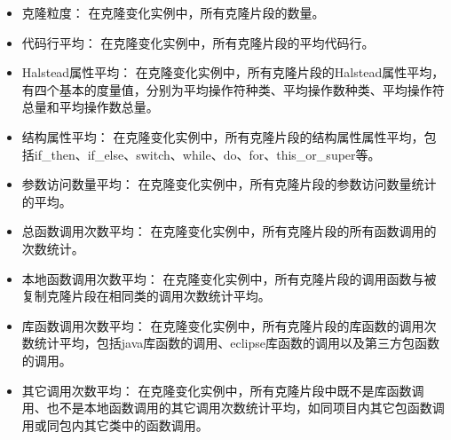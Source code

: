 \begin{itemize}
\item 
克隆粒度：
在克隆变化实例中，所有克隆片段的数量。
\item 
代码行平均：
在克隆变化实例中，所有克隆片段的平均代码行。
\item 
Halstead属性平均：
在克隆变化实例中，所有克隆片段的Halstead属性平均，有四个基本的度量值，分别为平均操作符种类、平均操作数种类、平均操作符总量和平均操作数总量。
\item
结构属性平均：
在克隆变化实例中，所有克隆片段的结构属性属性平均，包括{if\_then、if\_else、switch、while、do、for、this\_or\_super}等。 
\item 
参数访问数量平均：
在克隆变化实例中，所有克隆片段的参数访问数量统计的平均。
\item  
总函数调用次数平均：
在克隆变化实例中，所有克隆片段的所有函数调用的次数统计。
\item  
本地函数调用次数平均：
在克隆变化实例中，所有克隆片段的调用函数与被复制克隆片段在相同类的调用次数统计平均。
\item  
库函数调用次数平均：
在克隆变化实例中，所有克隆片段的库函数的调用次数统计平均，包括java库函数的调用、eclipse库函数的调用以及第三方包函数的调用。
\item  
其它调用次数平均：
在克隆变化实例中，所有克隆片段中既不是库函数调用、也不是本地函数调用的其它调用次数统计平均，如同项目内其它包函数调用或同包内其它类中的函数调用。
\end{itemize}


